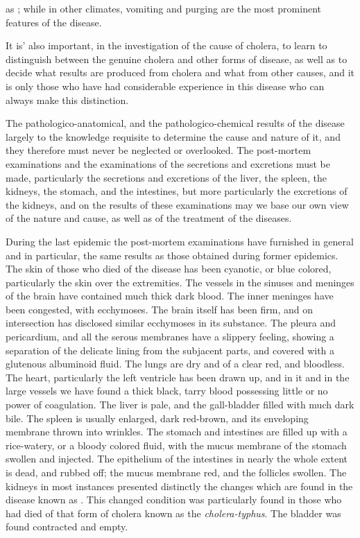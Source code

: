 as ; while in other climates, vomiting and purging
are the most prominent features of the disease.

It is' also important, in the investigation of the cause of cholera, to
learn to distinguish between the genuine cholera and other forms of
disease, as well as to decide what results are produced from cholera
and what from other causes, and it is only those who have had considerable
experience in this disease who can always make this distinction.

The pathologico-anatomical, and the pathologico-chemical results of
the disease  largely to the knowledge requisite to determine
the cause and nature of it, and they therefore must never be neglected
or overlooked. The post-mortem examinations and the examinations
of the secretions and excretions must be made, particularly the secretions
and excretions of the liver, the spleen, the kidneys, the stomach,
and the intestines, but more particularly the excretions of the kidneys,
and on the results of these examinations may we base our own view of
the nature and cause, as well as of the treatment of the diseases.

During the last epidemic the post-mortem examinations have furnished
in general and in particular, the same results as those obtained
during former epidemics. The skin of those who died of the disease has
been cyanotic, or blue colored, particularly the skin over the extremities.
The vessels in the sinuses and meninges of the brain have contained
much thick dark blood. The inner meninges have been congested, with
ecchymoses. The brain itself has been firm, and on intersection has
disclosed similar ecchymoses in its substance. The pleura and pericardium,
and all the serous membranes have a slippery feeling, showing a
separation of the delicate lining from the subjacent parts, and covered
with a glutenous albuminoid fluid. The lungs are dry and of a clear
red, and bloodless. The heart, particularly the left ventricle has been
drawn up, and in it and in the large vessels we have found a thick
black, tarry blood possessing little or no power of coagulation. The
liver is pale, and the gall-bladder filled with much dark bile. The
spleen is usually enlarged, dark red-brown, and its enveloping membrane
thrown into wrinkles. The stomach and intestines are filled up
with a rice-watery, or a bloody colored fluid, with the mucus membrane
of the stomach swollen and injected. The epithelium of the intestines
in nearly the whole extent is dead, and rubbed off; the mucus membrane
red, and the follicles swollen. The kidneys in most instances
presented distinctly the changes which are found in the disease known
as . This changed condition was particularly found in
those who had died of that form of cholera known as the \emph{cholera-typhus}.
The bladder was found contracted and empty.\endinput